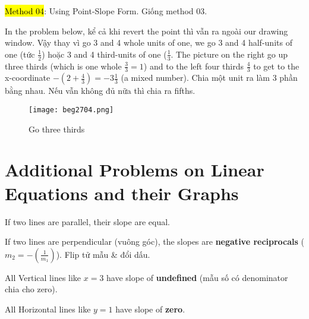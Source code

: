 \hl{Method 04}: Using Point-Slope Form. Giống method 03.

\vspace{8mm}

In the problem below, kể cả khi revert the point thì vẫn ra ngoài our drawing window. Vậy thay vì go 3 and 4 whole units of one, we go 3 and 4 half-units of one (tức $\frac{1}{2}$) hoặc 3 and 4 third-units of one ($\frac{1}{3}$. The picture on the right go up three thirds (which is one whole $\frac{3}{3}=1$) and to the left four thirds $\frac{4}{3}$ to get to the x-coordinate $-(2+\frac{4}{3})=-3\frac{1}{3}$ (a mixed number). Chia một unit ra làm 3 phần bằng nhau. Nếu vẫn không đủ nữa thì chia ra fifths.

\begin{figure}[htb!]
  \centering
  \texttt{[image: beg2704.png]}
  \caption{Go three thirds}
\end{figure}

\section{Additional Problems on Linear Equations and their Graphs}

If two lines are parallel, their slope are equal.

If two lines are perpendicular (vuông góc), the slopes are \textbf{negative reciprocals} ($m_{2}=-(\frac{1}{m_{1}})$). Flip tử mẫu \& đổi dấu.


\vspace{.4cm}

All Vertical lines like $x=3$ have slope of \textbf{undefined} (mẫu số có denominator chia cho zero).

All Horizontal lines like $y=1$ have slope of \textbf{zero}.

